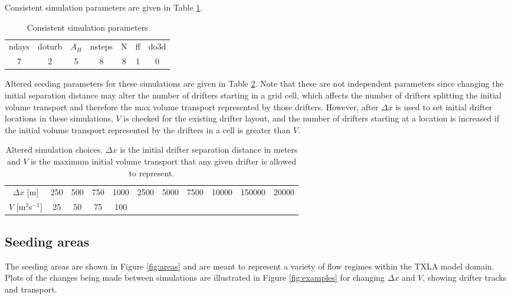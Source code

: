 \documentclass[11pt]{article}
\begin{document}
Consistent simulation parameters are given in Table \ref{tab:params}.

\begin{table}
\centering
\begin{tabular}{ccccccc}
	ndays & doturb & $A_H$ & nsteps & N & ff & do3d\\
	7     & 2      & 5     & 8      & 8 & 1  & 0
\end{tabular}
\caption{Consistent simulation parameters}
\label{tab:params}
\end{table}

Altered seeding parameters for these simulations are given in Table \ref{tab:seeding_params}. Note that these are not independent parameters since changing the initial separation distance may alter the number of drifters starting in a grid cell, which affects the number of drifters splitting the initial volume transport and therefore the max volume transport represented by those drifters. However, after $\Delta x$ is used to set initial drifter locations in these simulations, $V$ is checked for the existing drifter layout, and the number of drifters starting at a location is increased if the initial volume transport represented by the drifters in a cell is greater than $V$.

\begin{table}
\centering
\begin{tabular}{ccccccccccc}
	$\Delta x$ [m] & 250 & 500 & 750 & 1000 & 2500 & 5000 & 7500 & 10000 & 150000 & 20000 \\
	$V$ [m$^3$s$^{-1}$] & 25 & 50 & 75 & 100 & ~ & ~ & ~ & ~ & ~ & ~ \\
\end{tabular}
\caption{Altered simulation choices. $\Delta x$ is the initial drifter separation distance in meters and $V$ is the maximum initial volume transport that any given drifter is allowed to represent.}
\label{tab:seeding_params}
\end{table}

\subsection*{Seeding areas}

The seeding areas are shown in Figure \ref{fig:areas} and are meant to represent a variety of flow regimes within the TXLA model domain. Plots of the changes being made between simulations are illustrated in Figure \ref{fig:examples} for changing $\Delta x$ and $V$, showing drifter tracks and transport.
\end{document}
